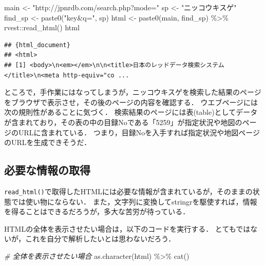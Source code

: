 \documentclass[
]{article}
\newenvironment{Shaded}{\begin{snugshade}}{\end{snugshade}}
\newcommand{\CommentTok}[1]{\textcolor[rgb]{0.56,0.35,0.01}{\textit{#1}}}
\newcommand{\FunctionTok}[1]{\textcolor[rgb]{0.00,0.00,0.00}{#1}}
\newcommand{\NormalTok}[1]{#1}
\newcommand{\OtherTok}[1]{\textcolor[rgb]{0.56,0.35,0.01}{#1}}
\newcommand{\SpecialCharTok}[1]{\textcolor[rgb]{0.00,0.00,0.00}{#1}}
\newcommand{\StringTok}[1]{\textcolor[rgb]{0.31,0.60,0.02}{#1}}
\begin{document}
\begin{Shaded}
\begin{Highlighting}[]
\NormalTok{main }\OtherTok{\textless{}{-}} \StringTok{"http://jpnrdb.com/search.php?mode="}
\NormalTok{sp }\OtherTok{\textless{}{-}} \StringTok{"ニッコウキスゲ"}
\NormalTok{find\_sp }\OtherTok{\textless{}{-}} \FunctionTok{paste0}\NormalTok{(}\StringTok{"key\&q="}\NormalTok{, sp)}
\NormalTok{html }\OtherTok{\textless{}{-}} 
  \FunctionTok{paste0}\NormalTok{(main, find\_sp) }\SpecialCharTok{\%\textgreater{}\%}
\NormalTok{  rvest}\SpecialCharTok{::}\FunctionTok{read\_html}\NormalTok{()}
\NormalTok{html}
\end{Highlighting}
\end{Shaded}

\begin{verbatim}
## {html_document}
## <html>
## [1] <body>\n<em></em>\n\n<title>日本のレッドデータ検索システム</title>\n<meta http-equiv="co ...
\end{verbatim}

ところで，手作業にはなってしまうが，ニッコウキスゲを検索した結果のページをブラウザで表示させ，その後のページの内容を確認する．
ウエブページには次の規則性があることに気づく．
検索結果のページには表(table)としてデータが含まれており，その表の中の目録Noである「5259」が指定状況や地図のページのURLに含まれている．
つまり，目録Noを入手すれば指定状況や地図ページのURLを生成できそうだ．

\hypertarget{ux5fc5ux8981ux306aux60c5ux5831ux306eux53d6ux5f97}{%
\subsection{必要な情報の取得}\label{ux5fc5ux8981ux306aux60c5ux5831ux306eux53d6ux5f97}}

\texttt{read\_html()}で取得したHTMLには必要な情報が含まれているが，そのままの状態では使い物にならない．
また，文字列に変換してstringrを駆使すれば，情報を得ることはできるだろうが，多大な苦労が待っている．

HTMLの全体を表示させたい場合は，以下のコードを実行する．
とてもではないが，これを自分で解析したいとは思わないだろう．

\begin{Shaded}
\begin{Highlighting}[]
 \CommentTok{\# 全体を表示させたい場合}
\FunctionTok{as.character}\NormalTok{(html) }\SpecialCharTok{\%\textgreater{}\%}
  \FunctionTok{cat}\NormalTok{()}
\end{Highlighting}
\end{Shaded}
\end{document}
